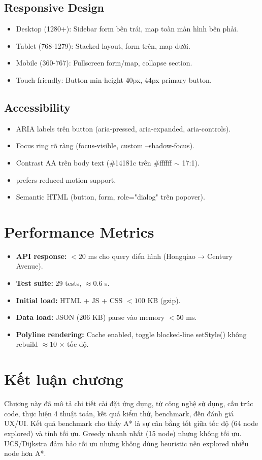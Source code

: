 \subsection{Responsive Design}

\begin{itemize}
  \item Desktop (1280+): Sidebar form bên trái, map toàn màn hình bên phải.
  \item Tablet (768-1279): Stacked layout, form trên, map dưới.
  \item Mobile (360-767): Fullscreen form/map, collapse section.
  \item Touch-friendly: Button min-height 40px, 44px primary button.
\end{itemize}

\subsection{Accessibility}

\begin{itemize}
  \item ARIA labels trên button (aria-pressed, aria-expanded, aria-controls).
  \item Focus ring rõ ràng (focus-visible, custom --shadow-focus).
  \item Contrast AA trên body text (\#14181c trên \#ffffff $\sim$ 17:1).
  \item prefers-reduced-motion support.
  \item Semantic HTML (button, form, role="dialog" trên popover).
\end{itemize}

\section{Performance Metrics}

\begin{itemize}
  \item \textbf{API response:} $< 20$ ms cho query điển hình (Hongqiao → Century Avenue).
  \item \textbf{Test suite:} 29 tests, $\approx 0.6$ s.
  \item \textbf{Initial load:} HTML + JS + CSS $< 100$ KB (gzip).
  \item \textbf{Data load:} JSON (206 KB) parse vào memory $< 50$ ms.
  \item \textbf{Polyline rendering:} Cache enabled, toggle blocked-line setStyle() không rebuild $\approx 10$ × tốc độ.
\end{itemize}

\section{Kết luận chương}

Chương này đã mô tả chi tiết cài đặt ứng dụng, từ công nghệ sử dụng, cấu trúc code, thực hiện 4 thuật toán, kết quả kiểm thử, benchmark, đến đánh giá UX/UI. Kết quả benchmark cho thấy A* là sự cân bằng tốt giữa tốc độ (64 node explored) và tính tối ưu. Greedy nhanh nhất (15 node) nhưng không tối ưu. UCS/Dijkstra đảm bảo tối ưu nhưng không dùng heuristic nên explored nhiều node hơn A*.
